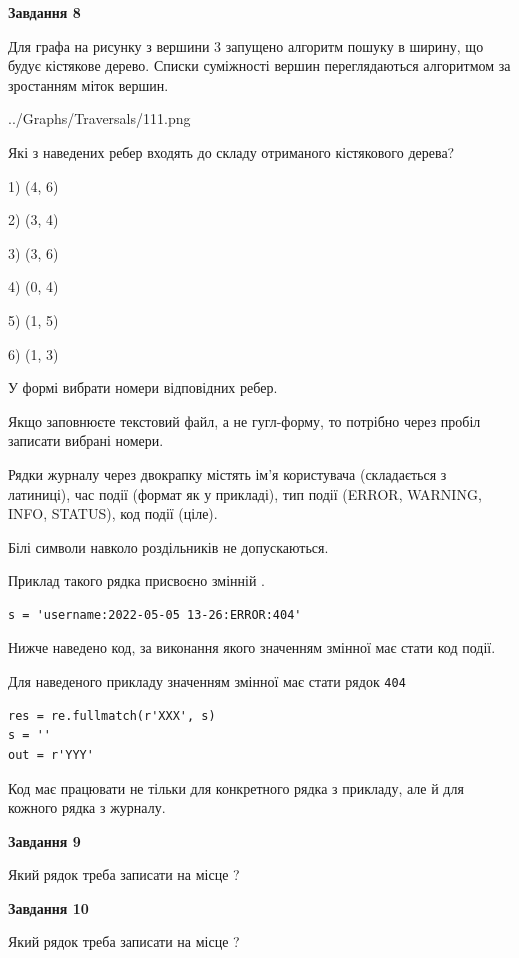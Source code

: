\documentclass[12pt, ukrainian]{article}
\def\code#1{\Verb!#1!}
\begin{document}
{\begin {large}
{\begin {center}\textbf{Завдання 8}\end {center}}\par
Для графа на рисунку з вершини 3 запущено алгоритм пошуку в ширину, що будує кістякове дерево. Списки суміжності вершин переглядаються алгоритмом за зростанням міток вершин.\par
\begin{center}
	{../Graphs/Traversals/111.png}
\end{center}
\par Які з наведених ребер входять до складу отриманого кістякового дерева?\par
1) (4, 6)\par
2) (3, 4)\par
3) (3, 6)\par
4) (0, 4)\par
5) (1, 5)\par
6) (1, 3)\par
{\vskip 15pt} У формі вибрати номери відповідних ребер.


Якщо заповнюєте текстовий файл, а не гугл-форму, то потрібно через пробіл записа\-ти вибрані номери.\par
\newpage


Рядки журналу через двокрапку містять ім'я користувача (складається з латиниці), час події (фор\-мат як у прикладі), тип події (ERROR, WARNING, INFO, STATUS), код події (ціле).

Білі символи навколо роздільників не допускаються.

Приклад такого рядка присвоєно змінній .



\begin{verbatim}
s = 'username:2022-05-05 13-26:ERROR:404'
\end{verbatim}


Нижче наведено код, за виконання якого значенням змінної  має стати код події.

Для наведеного прикладу значенням змінної  має стати рядок \code{404}



\begin{verbatim}
res = re.fullmatch(r'XXX', s)
s = ''
out = r'YYY'
\end{verbatim}


Код має працювати не тільки для конкретного рядка з прикладу, але й для кожного рядка з журналу.

{\begin {center}\textbf{Завдання 9}\end {center}}\par
Який рядок треба записати на місце  ?\par
\vspace{5mm}


{\begin {center}\textbf{Завдання 10}\end {center}}\par
Який рядок треба записати на місце  ?\par


\newpage


\end {large}}
\end{document}
